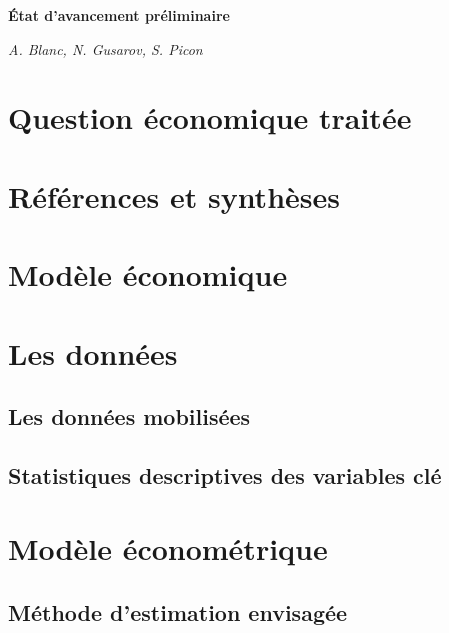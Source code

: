 \documentclass[11pt, a4paper]{article}
\begin{document}
\begin{center}
    \Large\textbf{État d'avancement préliminaire}
    \par
    \large\textit{A. Blanc, N. Gusarov, S. Picon}
\end{center}


\section*{Question économique traitée}

\section*{Références et synthèses}

\section*{Modèle économique}

\section*{Les données}

\subsection*{Les données mobilisées}

\subsection*{Statistiques descriptives des variables clé}

\section*{Modèle économétrique}

\subsection*{Méthode d'estimation envisagée}

\end{document}
